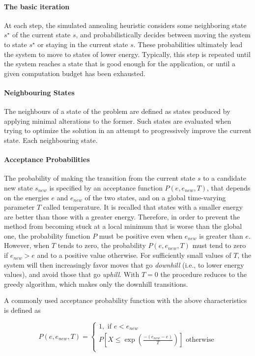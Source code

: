 \paragraph{The basic iteration} At each step, the simulated annealing heuristic considers some neighboring state $s^\star$ of the current state $s$, and probabilistically decides between moving the system to state $s^\star$ or staying in the current state $s$. These probabilities ultimately lead the system to move to states of lower energy. Typically, this step is repeated until the system reaches a state that is good enough for the application, or until a given computation budget has been exhausted.

\paragraph{Neighbouring States} The neighbours of a state of the problem are defined as states produced by applying minimal alterations to the former. Such states are evaluated when trying to optimize the solution in an attempt to progressively improve the current state. Each neighbouring state.

\paragraph{Acceptance Probabilities}  The probability of making the transition from the current state $s$ to a candidate new state $s_{new}$ is specified by an acceptance function $P(e, e_{new}, T)$, that depends on the energies $e$ and $e_{new}$ of the two states, and on a global time-varying parameter $T$ called temperature.
It is recalled that states with a smaller energy are better than those with a greater energy. Therefore, in order to prevent the method from becoming stuck at a local minimum that is worse than the global one, the probability function $P$ must be positive even when  $e_{new}$ is greater than $e$. However, when $T$ tends to zero, the probability $P(e, e_{new}, T)$ must tend to zero if $e_{new} > e$ and to a positive value otherwise. For sufficiently small values of $T$, the system will then increasingly favor moves that go \textit{downhill} (i.e., to lower energy values), and avoid those that go \textit{uphill}. With $T = 0$ the procedure reduces to the greedy algorithm, which makes only the downhill transitions.
\par
A commonly used acceptance probability function with the above characteristics is defined as

$$
P(e, e_{new}, T) = \left\{
    \begin{array}{ll}
          1, \text{ if } e < e_{new} \\
          P[X \leq \exp({\frac{-(e_{new} - e)}{T}})] \text{ otherwise} \\
    \end{array} 
\right.
$$

